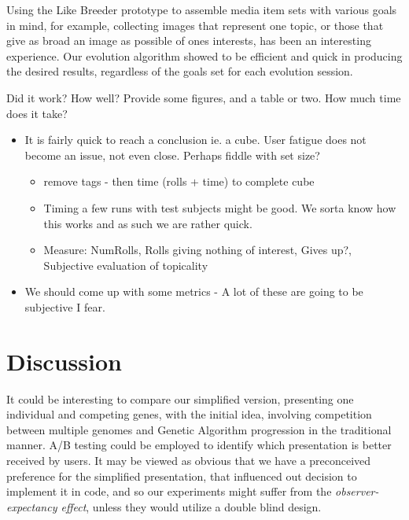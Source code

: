 \documentclass[]{article}
\begin{document}
Using the Like Breeder prototype to assemble media item sets with various goals in mind, for example, collecting images that represent one topic, or those that give as broad an image as possible of ones interests, has been an interesting experience.  Our evolution algorithm showed to be efficient and quick in producing the desired results, regardless of the goals set for each evolution session.



\begin{framed}
Did it work? How well? Provide some figures, and a table or two. How much time does it take?
\end{framed}
\begin{itemize}		
\item It is fairly quick to reach a conclusion ie. a cube. User fatigue does not become an issue, not even close. Perhaps fiddle with set size?
	\begin{itemize}
	\item remove tags - then time (rolls + time) to complete cube
	\item Timing a few runs with test subjects might be good. We sorta know how this works and as such we are rather quick.
	\item Measure: NumRolls, Rolls giving nothing of interest, Gives up?, Subjective evaluation of topicality
	\end{itemize}
\item We should come up with some metrics - A lot of these are going to be subjective I fear.
\end{itemize}



\section{Discussion}
\label{sec:Discussion}

It could be interesting to compare our simplified version, presenting one individual and competing genes, with the initial idea, involving competition between multiple genomes and Genetic Algorithm progression in the traditional manner.  A/B testing could be employed to identify which presentation is better received by users.  It may be viewed as obvious that we have a preconceived preference for the simplified presentation, that influenced out decision to implement it in code, and so our experiments might suffer from the \textit{observer-expectancy effect}, unless they would utilize a double blind design.
\end{document}

